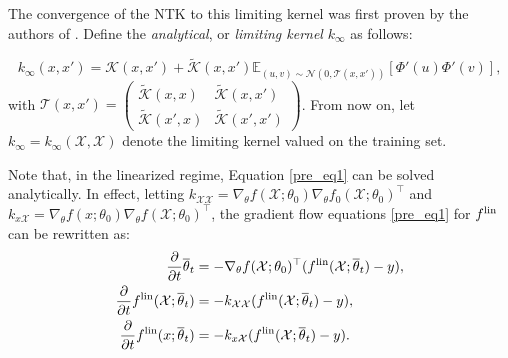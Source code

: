 \documentclass{article}
\theoremstyle{definition}
\theoremstyle{remark}
\numberwithin{equation}{section}
\newcommand{\X}{\mathcal{X}}
\newcommand{\E}{\mathbb{E}}
\newcommand{\ktest}{k_{x\X}}
\newcommand{\ktrain}{k_{\X\X}}
\newcommand{\lin}{{\textup{lin}}}
\begin{document}
The convergence of the NTK to this limiting kernel was first proven by the authors of \cite{jacot}.
Define the \emph{analytical}, or \emph{limiting kernel} $k_\infty$ as follows:

\[
    k_\infty(x,x') = \mathcal K(x,x') + \tilde{\mathcal K}(x,x') \E_{(u,v) \sim \mathcal N(0,\mathcal T(x,x'))}[\Phi'(u)\Phi'(v)],
\]
with $\mathcal T(x,x') = \begin{pmatrix}
    \tilde {\mathcal K}(x,x) & \tilde {\mathcal K}(x,x') \\
    \tilde {\mathcal K}(x',x) & \tilde {\mathcal K}(x',x')
\end{pmatrix}$.
From now on, let $k_\infty = k_\infty(\X,\X)$ denote the limiting kernel valued on the training set.


Note that, in the linearized regime, Equation \eqref{pre_eq1} can be solved analytically.
In effect, letting $\ktrain = \nabla_{\theta}f(\X;\theta_0) \nabla_{\theta}f_0(\X;\theta_0)^\top$ and $\ktest = \nabla_{\theta}f(x;\theta_0) \nabla_{\theta}f(\X;\theta_0)^\top$,
the gradient flow equations \eqref{pre_eq1} for $f^\lin$ can be rewritten as:
\begin{align}
    \begin{split}
        \label{eq1} \frac{\partial}{\partial t} {\overline \theta_t} &= - \nabla_{\theta}f(\X;\theta_0)^\top (f^\lin(\X;\overline \theta_t) - y),\\
        \frac{\partial}{\partial t} {f^\lin}(\X;\overline \theta_t) &= -\ktrain (f^\lin(\X;\overline \theta_t) - y),\\
         \frac{\partial}{\partial t} {f^\lin}(x;\overline \theta_t) &= -\ktest (f^\lin(\X;\overline \theta_t) - y).
    \end{split}
\end{align}
\end{document}
